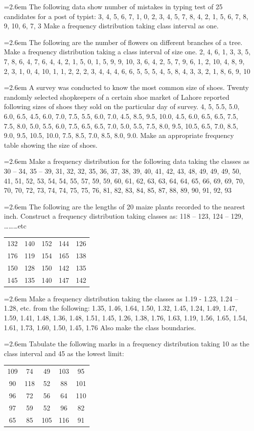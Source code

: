 \documentclass[11pt,a4paper]{article}
\newcommand{\Q}[2]{\par\smallskip\noindent\hangindent=2.6em\hangafter=1
  \makebox[2.6em][l]{\textbf{#1.}}#2\par}
\newcommand{\dtab}[2]{\par\smallskip\noindent\hspace*{2.6em}\begin{tabular}{#1}\hline #2\\ \hline\end{tabular}\par\smallskip}
\begin{document}
\Q{1}{The following data show number of mistakes in typing test of 25 candidates for a post of typist: 3, 4, 5, 6, 7, 1, 0, 2, 3, 4, 5, 7, 8, 4, 2, 1, 5, 6, 7, 8, 9, 10, 6, 7, 3 Make a frequency distribution taking class interval as one.}
\Q{2}{The following are the number of flowers on different branches of a tree. Make a frequency distribution taking a class interval of size one. 2, 4, 6, 1, 3, 3, 5, 7, 8, 6, 4, 7, 6, 4, 4, 2, 1, 5, 0, 1, 5, 9, 9, 10, 3, 6, 4, 2, 5, 7, 9, 6, 1, 2, 10, 4, 8, 9, 2, 3, 1, 0, 4, 10, 1, 1, 2, 2, 2, 3, 4, 4, 4, 6, 6, 5, 5, 5, 4, 5, 8, 4, 3, 3, 2, 1, 8, 6, 9, 10}
\Q{3}{A survey was conducted to know the most common size of shoes. Twenty randomly selected shopkeepers of a certain shoe market of Lahore reported following sizes of shoes they sold on the particular day of survey. 4, 5, 5.5, 5.0, 6.0, 6.5, 4.5, 6.0, 7.0, 7.5, 5.5, 6.0, 7.0, 4.5, 8.5, 9.5, 10.0, 4.5, 6.0, 6.5, 6.5, 7.5, 7.5, 8.0, 5.0, 5.5, 6.0, 7.5, 6.5, 6.5, 7.0, 5.0, 5.5, 7.5, 8.0, 9.5, 10.5, 6.5, 7.0, 8.5, 9.0, 9.5, 10.5, 10.0, 7.5, 8.5, 7.0, 8.5, 8.0, 9.0. Make an appropriate frequency table showing the size of shoes.}
\Q{4}{Make a frequency distribution for the following data taking the classes as 30  --  34, 35  --  39, 31, 32, 32, 35, 36, 37, 38, 39, 40, 41, 42, 43, 48, 49, 49, 49, 50, 41, 51, 52, 53, 54, 54, 55, 57, 59, 59, 60, 61, 62, 63, 63, 64, 64, 65, 66, 69, 69, 70, 70, 70, 72, 73, 74, 74, 75, 75, 76, 81, 82, 83, 84, 85, 87, 88, 89, 90, 91, 92, 93}
\Q{5}{The following are the lengths of 20 maize plants recorded to the nearest inch. Construct a frequency distribution taking classes as: 118 -- 123, 124 -- 129, \ldots\ldots\ldots etc\dtab{|c@{\hspace{2em}}c@{\hspace{2em}}c@{\hspace{2em}}c@{\hspace{2em}}c|}{132 & 140 & 152 & 144 & 126 \\ 176 & 119 & 154 & 165 & 138 \\ 150 & 128 & 150 & 142 & 135 \\ 145 & 135 & 140 & 147 & 142}}
\Q{6}{Make a frequency distribution taking the classes as 1.19 - 1.23, 1.24  --  1.28, etc. from the following: 1.35, 1.46, 1.64, 1.50, 1.32, 1.45, 1.24, 1.49, 1.47, 1.59, 1.41, 1.48, 1.36, 1.48, 1.51, 1.45, 1.26, 1.38, 1.76, 1.63, 1.19, 1.56, 1.65, 1.54, 1.61, 1.73, 1.60, 1.50, 1.45, 1.76 Also make the class boundaries.}
\Q{7}{Tabulate the following marks in a frequency distribution taking 10 as the class interval and 45 as the lowest limit:\dtab{|c@{\hspace{2em}}c@{\hspace{2em}}c@{\hspace{2em}}c@{\hspace{2em}}c|}{109 & 74 & 49 & 103 & 95 \\ 90 & 118 & 52 & 88 & 101 \\ 96 & 72 & 56 & 64 & 110 \\ 97 & 59 & 52 & 96 & 82 \\ 65 & 85 & 105 & 116 & 91}}
\end{document}
